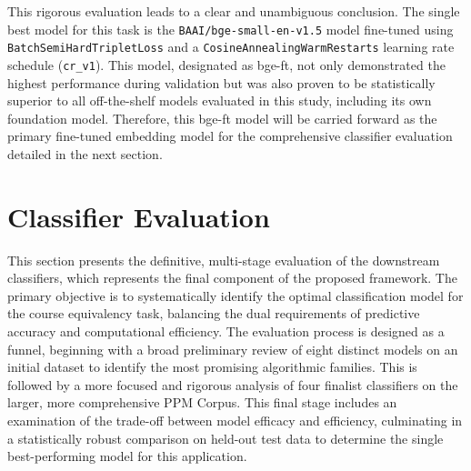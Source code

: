 This rigorous evaluation leads to a clear and unambiguous conclusion. The single best model for this task is the \verb|BAAI/bge-small-en-v1.5| model fine-tuned using \verb|BatchSemiHardTripletLoss| and a \verb|CosineAnnealingWarmRestarts| learning rate schedule (\verb|cr_v1|). This model, designated as bge-ft, not only demonstrated the highest performance during validation but was also proven to be statistically superior to all off-the-shelf models evaluated in this study, including its own foundation model. Therefore, this bge-ft model will be carried forward as the primary fine-tuned embedding model for the comprehensive classifier evaluation detailed in the next section.{\setlength{\emergencystretch}{5em}\par}

\section{Classifier Evaluation}
This section presents the definitive, multi-stage evaluation of the downstream classifiers, which represents the final component of the proposed framework. The primary objective is to systematically identify the optimal classification model for the course equivalency task, balancing the dual requirements of predictive accuracy and computational efficiency. The evaluation process is designed as a funnel, beginning with a broad preliminary review of eight distinct models on an initial dataset to identify the most promising algorithmic families. This is followed by a more focused and rigorous analysis of four finalist classifiers on the larger, more comprehensive PPM Corpus. This final stage includes an examination of the trade-off between model efficacy and efficiency, culminating in a statistically robust comparison on held-out test data to determine the single best-performing model for this application.


